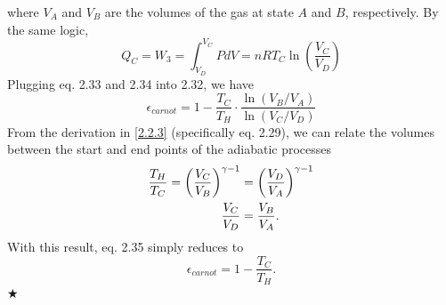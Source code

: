 \noindent where $V_A$ and $V_B$ are the volumes of the gas at state $A$ and $B$, respectively. By the same logic, 
\begin{equation}
    Q_C = W_3 = \int_{V_D}^{V_C}PdV = nRT_C\ln\left(\frac{V_C}{V_D}\right)
\end{equation}
\noindent Plugging eq. 2.33 and 2.34 into 2.32, we have
\begin{equation}
    \epsilon_{carnot} = 1-\frac{T_C}{T_H}\cdot\frac{\ln(V_B/V_A)}{\ln(V_C/V_D)}
\end{equation}
\noindent From the derivation in \ref{2.2.3} (specifically eq. 2.29), we can relate the volumes between the start and end points of the adiabatic processes
\begin{align*}
    \frac{T_H}{T_C} = \left(\frac{V_C}{V_B}\right)^{\gamma-1} &= \left(\frac{V_D}{V_A}\right)^{\gamma-1} \nonumber \\
    \frac{V_C}{V_D} &= \frac{V_B}{V_A}.
\end{align*}
\noindent With this result, eq. 2.35 simply reduces to 
\begin{equation}
    \boxed{\epsilon_{carnot} = 1-\frac{T_C}{T_H}}.
\end{equation}
$\bigstar$